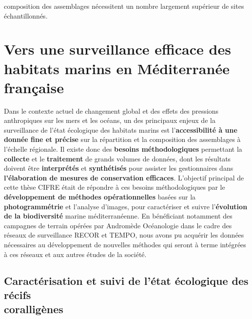 composition des assemblages nécessitent un nombre largement supérieur de sites échantillonnés.

\section{Vers une surveillance efficace des habitats marins en Méditerranée française}\label{discussion.2}

Dans le contexte actuel de changement global et des effets des pressions anthropiques sur les mers et les océans, un des principaux enjeux de la surveillance de l’état écologique des habitats marins est l’\textbf{accessibilité à une donnée fine et précise} sur la répartition et la composition des assemblages à l’échelle régionale. Il existe donc des \textbf{besoins méthodologiques} permettant la \textbf{collecte} et le \textbf{traitement} de grands volumes de données, dont les résultats doivent être \textbf{interprétés} et \textbf{synthétisés} pour assister les gestionnaires dans \textbf{l’élaboration de mesures de conservation efficaces}. L’objectif principal de cette thèse CIFRE était de répondre à ces besoins méthodologiques par le \textbf{développement de méthodes opérationnelles} basées sur la \textbf{photogrammétrie} et l’analyse d’images, pour caractériser et suivre l’\textbf{évolution de la biodiversité} marine méditerranéenne. En bénéficiant notamment des campagnes de terrain opérées par Andromède Océanologie dans le cadre des réseaux de surveillance RECOR et TEMPO, nous avons pu acquérir les données nécessaires au développement de nouvelles méthodes qui seront à terme intégrées à ces réseaux et aux autres études de la société.

\subsection{Caractérisation et suivi de l’état écologique des récifs\\ coralligènes}

